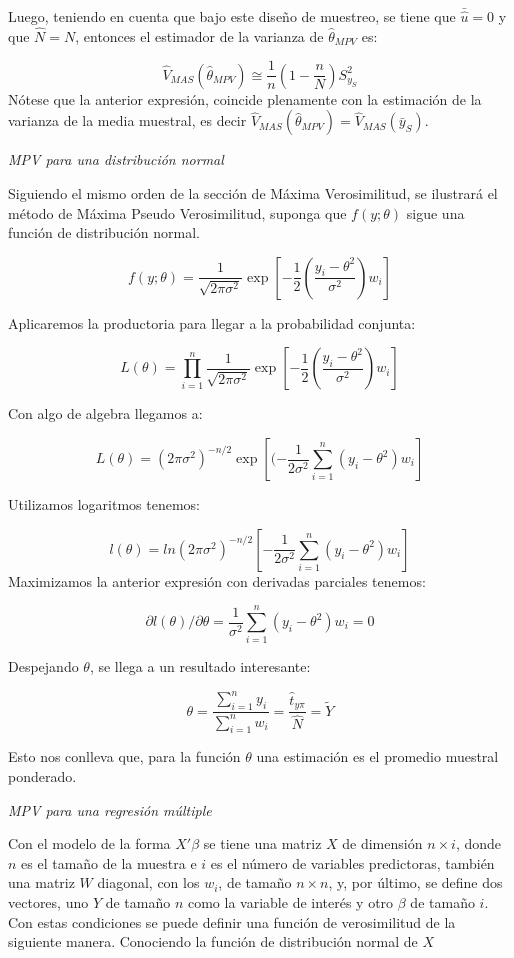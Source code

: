 \documentclass[
  12pt,
]{book}
\begin{document}
Luego, teniendo en cuenta que bajo este diseño de muestreo, se tiene que \(\bar{\hat{u}}=0\) y que \(\hat{N}=N\), entonces el estimador de la varianza de \(\hat{\theta}_{MPV}\) es:

\[
\hat{V}_{MAS}(\hat{\theta}_{MPV})\cong\frac{1}{n}\left(1-\frac{n}{N}\right)S_{y_{S}}^{2}
\]
Nótese que la anterior expresión, coincide plenamente con la estimación de la varianza de la media muestral, es decir \(\hat{V}_{MAS}(\hat{\theta}_{MPV})=\hat{V}_{MAS}(\bar{y}_{S})\).

\emph{MPV para una distribución normal}

Siguiendo el mismo orden de la sección de Máxima Verosimilitud, se ilustrará el método de Máxima Pseudo Verosimilitud, suponga que \(f(y;\theta)\) sigue una función de distribución normal.

\[
f(y;\theta)=\dfrac{1}{\sqrt{2\pi\sigma^{2}}}\exp\left[-\dfrac{1}{2}\left(\dfrac{y_{i}-\theta^{2}}{\sigma^{2}}\right)w_{i}\right]
\]

Aplicaremos la productoria para llegar a la probabilidad conjunta:

\[
L(\theta)=\prod_{i=1}^{n}\dfrac{1}{\sqrt{2\pi\sigma^{2}}}\exp\left[-\dfrac{1}{2}\left(\dfrac{y_{i}-\theta^{2}}{\sigma^{2}}\right)w_{i}\right]
\]

Con algo de algebra llegamos a:

\[
L(\theta)=(2\pi\sigma^{2})^{-n/2}\exp[(-\dfrac{1}{2\sigma^{2}}\sum_{i=1}^{n}(y_{i}-\theta^{2})w_{i}]
\]

Utilizamos logaritmos tenemos:

\[
l(\theta)=ln(2\pi\sigma^{2})^{-n/2}[-\dfrac{1}{2\sigma^{2}}\sum_{i=1}^{n}(y_{i}-\theta^{2})w_{i}]
\]
Maximizamos la anterior expresión con derivadas parciales tenemos:

\[
\partial l(\theta)/\partial\theta=\dfrac{1}{\sigma^{2}}\sum_{i=1}^{n}(y_{i}-\theta^{2})w_{i}=0
\]

Despejando \(\theta\), se llega a un resultado interesante:

\[
\theta=\dfrac{\sum_{i=1}^{n}y_{i}}{\sum_{i=1}^{n}w_{i}}=\dfrac{\hat{t}_{y\pi}}{\hat{N}}=\tilde{Y}
\]

Esto nos conlleva que, para la función \(\theta\) una estimación es el promedio muestral ponderado.

\emph{MPV para una regresión múltiple}

Con el modelo de la forma \(X'\beta\) se tiene una matriz \(X\) de dimensión \(n\times i\), donde \(n\) es el tamaño de la muestra e \(i\) es el número de variables predictoras, también una matriz \(W\) diagonal, con los \(w_{i}\), de tamaño \(n\times n\), y, por último, se define dos vectores, uno \(Y\) de tamaño \(n\) como la variable de interés y otro \(\beta\) de tamaño \(i\). Con estas condiciones se puede definir una función de verosimilitud de la siguiente manera. Conociendo la función de distribución normal de \(X\)
\end{document}

